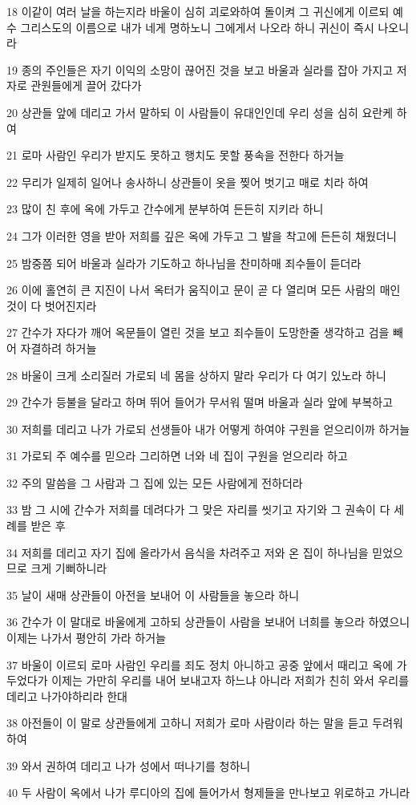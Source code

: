 \par 18 이같이 여러 날을 하는지라 바울이 심히 괴로와하여 돌이켜 그 귀신에게 이르되 예수 그리스도의 이름으로 내가 네게 명하노니 그에게서 나오라 하니 귀신이 즉시 나오니라
\par 19 종의 주인들은 자기 이익의 소망이 끊어진 것을 보고 바울과 실라를 잡아 가지고 저자로 관원들에게 끌어 갔다가
\par 20 상관들 앞에 데리고 가서 말하되 이 사람들이 유대인인데 우리 성을 심히 요란케 하여
\par 21 로마 사람인 우리가 받지도 못하고 행치도 못할 풍속을 전한다 하거늘
\par 22 무리가 일제히 일어나 송사하니 상관들이 옷을 찢어 벗기고 매로 치라 하여
\par 23 많이 친 후에 옥에 가두고 간수에게 분부하여 든든히 지키라 하니
\par 24 그가 이러한 영을 받아 저희를 깊은 옥에 가두고 그 발을 착고에 든든히 채웠더니
\par 25 밤중쯤 되어 바울과 실라가 기도하고 하나님을 찬미하매 죄수들이 듣더라
\par 26 이에 홀연히 큰 지진이 나서 옥터가 움직이고 문이 곧 다 열리며 모든 사람의 매인 것이 다 벗어진지라
\par 27 간수가 자다가 깨어 옥문들이 열린 것을 보고 죄수들이 도망한줄 생각하고 검을 빼어 자결하려 하거늘
\par 28 바울이 크게 소리질러 가로되 네 몸을 상하지 말라 우리가 다 여기 있노라 하니
\par 29 간수가 등불을 달라고 하며 뛰어 들어가 무서워 떨며 바울과 실라 앞에 부복하고
\par 30 저희를 데리고 나가 가로되 선생들아 내가 어떻게 하여야 구원을 얻으리이까 하거늘
\par 31 가로되 주 예수를 믿으라 그리하면 너와 네 집이 구원을 얻으리라 하고
\par 32 주의 말씀을 그 사람과 그 집에 있는 모든 사람에게 전하더라
\par 33 밤 그 시에 간수가 저희를 데려다가 그 맞은 자리를 씻기고 자기와 그 권속이 다 세례를 받은 후
\par 34 저희를 데리고 자기 집에 올라가서 음식을 차려주고 저와 온 집이 하나님을 믿었으므로 크게 기뻐하니라
\par 35 날이 새매 상관들이 아전을 보내어 이 사람들을 놓으라 하니
\par 36 간수가 이 말대로 바울에게 고하되 상관들이 사람을 보내어 너희를 놓으라 하였으니 이제는 나가서 평안히 가라 하거늘
\par 37 바울이 이르되 로마 사람인 우리를 죄도 정치 아니하고 공중 앞에서 때리고 옥에 가두었다가 이제는 가만히 우리를 내어 보내고자 하느냐 아니라 저희가 친히 와서 우리를 데리고 나가야하리라 한대
\par 38 아전들이 이 말로 상관들에게 고하니 저희가 로마 사람이라 하는 말을 듣고 두려워하여
\par 39 와서 권하여 데리고 나가 성에서 떠나기를 청하니
\par 40 두 사람이 옥에서 나가 루디아의 집에 들어가서 형제들을 만나보고 위로하고 가니라

